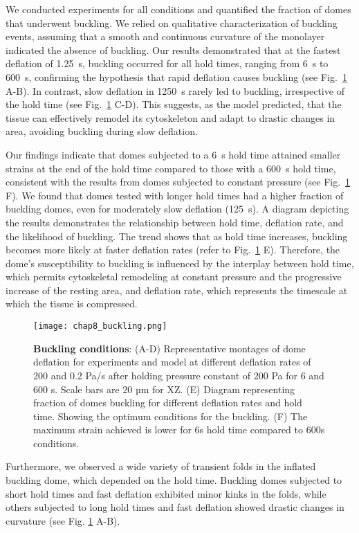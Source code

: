 We conducted experiments for all conditions and quantified the fraction of domes that underwent buckling. We relied on qualitative characterization of buckling events, assuming that a smooth and continuous curvature of the monolayer indicated the absence of buckling. Our results demonstrated that at the fastest deflation of 1.25~s, buckling occurred for all hold times, ranging from 6~s to 600~s, confirming the hypothesis that rapid deflation causes buckling (see Fig.~\ref{fig_8_3} A-B). In contrast, slow deflation in 1250~s rarely led to buckling, irrespective of the hold time (see Fig.~\ref{fig_8_3} C-D). This suggests, as the model predicted, that the tissue can effectively remodel its cytoskeleton and adapt to drastic changes in area, avoiding buckling during slow deflation.

Our findings indicate that domes subjected to a 6~s hold time attained smaller strains at the end of the hold time compared to those with a 600~s hold time, consistent with the results from domes subjected to constant pressure (see Fig.~\ref{fig_8_3} F). We found that domes tested with longer hold times had a higher fraction of buckling domes, even for moderately slow deflation (125~s). A  diagram depicting the results demonstrates the relationship between hold time, deflation rate, and the likelihood of buckling. The trend shows that as hold time increases, buckling becomes more likely at faster deflation rates (refer to Fig.~\ref{fig_8_3} E). Therefore, the dome's susceptibility to buckling is influenced by the interplay between hold time, which permits cytoskeletal remodeling at constant pressure and the progressive increase of the resting area, and deflation rate, which represents the timescale at which the tissue is compressed.

\begin{figure}[b!]
	\centering
	\texttt{[image: chap8\_buckling.png]}
	\caption{\label{fig_8_3} \textbf{Buckling conditions}: (A-D) Representative montages of dome deflation for experiments and model at different deflation rates of 200 and 0.2 Pa/s after holding pressure constant of 200 Pa for 6 and 600 s. Scale bars are 20 µm for XZ. (E) Diagram representing fraction of domes buckling for different deflation rates and hold time. Showing the optimum conditions for the buckling. (F) The maximum strain achieved is lower for 6s hold time compared to 600s conditions.}
\end{figure}

Furthermore, we observed a wide variety of transient folds in the inflated buckling dome, which depended on the hold time. Buckling domes subjected to short hold times and fast deflation exhibited minor kinks in the folds, while others subjected to long hold times and fast deflation showed drastic changes in curvature (see Fig. \ref{fig_8_3} A-B).

